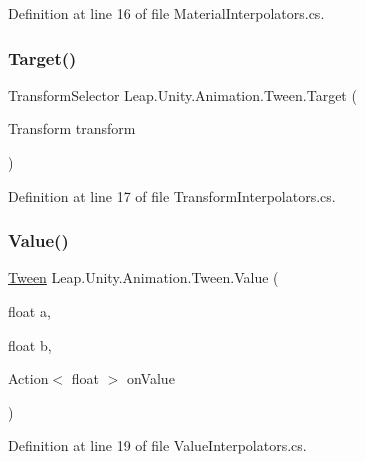 Definition at line 16 of file Material\+Interpolators.\+cs.

\mbox{\label{struct_leap_1_1_unity_1_1_animation_1_1_tween_aa7b22a26af26ea28523475885b119dda}} 
\subsubsection{\texorpdfstring{Target()}{Target()}\hspace{0.1cm}{\footnotesize\ttfamily [2/2]}}
{\footnotesize\ttfamily Transform\+Selector Leap.\+Unity.\+Animation.\+Tween.\+Target (\begin{DoxyParamCaption}\item[{Transform}]{transform }\end{DoxyParamCaption})}



Definition at line 17 of file Transform\+Interpolators.\+cs.

\mbox{\label{struct_leap_1_1_unity_1_1_animation_1_1_tween_a831691155a74d63fe5a0a8c07bce6d13}} 
\subsubsection{\texorpdfstring{Value()}{Value()}\hspace{0.1cm}{\footnotesize\ttfamily [1/5]}}
{\footnotesize\ttfamily \mbox{\hyperlink{struct_leap_1_1_unity_1_1_animation_1_1_tween}{Tween}} Leap.\+Unity.\+Animation.\+Tween.\+Value (\begin{DoxyParamCaption}\item[{float}]{a,  }\item[{float}]{b,  }\item[{Action$<$ float $>$}]{on\+Value }\end{DoxyParamCaption})}



Definition at line 19 of file Value\+Interpolators.\+cs.

\mbox{\label{struct_leap_1_1_unity_1_1_animation_1_1_tween_a4b8b8872079eed40ed3565488390768b}} 
